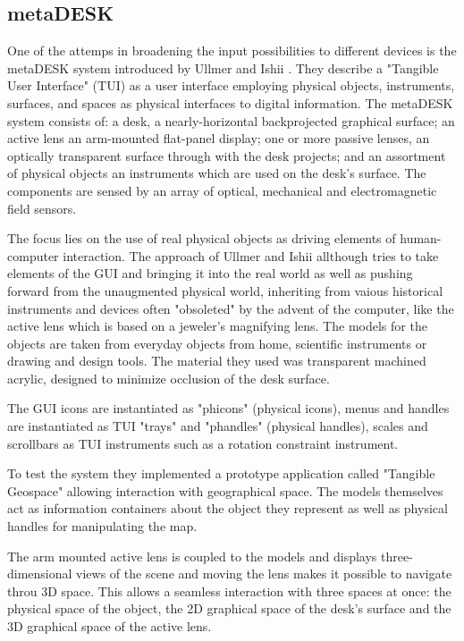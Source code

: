 \subsection{metaDESK}
One of the attemps in broadening the input possibilities to different devices is the metaDESK system introduced by Ullmer and Ishii \cite{ullmer97}. They describe a "Tangible User Interface" (TUI) as a user interface employing physical objects, instruments, surfaces, and spaces as physical interfaces to digital information. The metaDESK system consists of: a desk, a nearly-horizontal backprojected graphical surface; an active lens an arm-mounted flat-panel display; one or more passive lenses, an optically transparent surface through with the desk projects; and an assortment of physical objects an instruments which are used on the desk's surface. The components are sensed by an array of optical, mechanical and electromagnetic field sensors.

The focus lies on the use of real physical objects as driving elements of human-computer interaction. The approach of Ullmer and Ishii allthough tries to take elements of the GUI and bringing it into the real world as well as pushing forward from the unaugmented physical world, inheriting from vaious historical instruments and devices often "obsoleted" by the advent of the computer, like the active lens which is based on a jeweler's magnifying lens. The models for the objects are taken from everyday objects from home, scientific instruments or drawing and design tools. The material they used was transparent machined acrylic, designed to minimize occlusion of the desk surface.

The GUI icons are instantiated as "phicons" (physical icons), menus and handles are instantiated as TUI "trays" and "phandles" (physical handles), scales and scrollbars as TUI instruments such as a rotation constraint instrument. 

To test the system they implemented a prototype application called "Tangible Geospace" allowing interaction with geographical space.
The models themselves act as information containers about the object they represent as well as physical handles for manipulating the map.

The arm mounted active lens is coupled to the models and displays three-dimensional views of the scene and moving the lens makes it possible to navigate throu 3D space. This allows a seamless interaction with three spaces at once: the physical space of the object, the 2D graphical space of the desk's surface and the 3D graphical space of the active lens.

